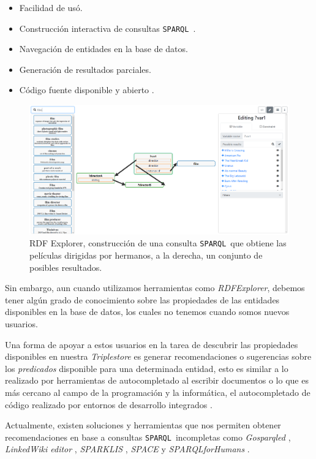 \documentclass[conference,compsoc]{IEEEtran}
\newcommand{\spql}{\texttt{SPARQL}\ }
\begin{document}
\begin{itemize}
    \item Facilidad de usó.
    \item Construcción interactiva de consultas \spql.
    \item Navegación de entidades en la base de datos.
    \item Generación de resultados parciales.
    \item Código fuente disponible y abierto \cite{vargas2019rdfrepo}.
\end{itemize}

\begin{figure}
    \label{fig:rdfexplorer}
    \centering
    \includegraphics[width=\linewidth]{rdfexplorer.png}
    \caption{RDF Explorer, construcción de una consulta \spql que obtiene las películas dirigidas
    por hermanos, a la derecha, un conjunto de posibles resultados.}
\end{figure}

Sin embargo, aun cuando utilizamos herramientas como \textit{RDFExplorer}, debemos tener
algún grado de conocimiento sobre las propiedades de las entidades disponibles
en la base de datos, los cuales no tenemos cuando somos nuevos usuarios.

Una forma de apoyar a estos usuarios en la tarea de descubrir las propiedades disponibles
en nuestra \textit{Triplestore} es generar recomendaciones o sugerencias sobre los \textit{predicados}
disponible para una determinada entidad, esto es similar a lo realizado por herramientas de autocompletado
al escribir documentos o lo que es más cercano al campo de la programación y la informática, el
autocompletado de código realizado por entornos de desarrollo integrados \cite{bruch2009learning}.

Actualmente, existen soluciones y herramientas que nos permiten obtener recomendaciones en base a 
consultas \spql incompletas como \textit{Gosparqled} \cite{campinas2014live}, \textit{LinkedWiki editor}
\cite{rafes2018designing}, \textit{SPARKLIS} \cite{ferre2017sparklis}, \textit{SPACE} \cite{kramer2013space}
y \textit{SPARQLforHumans} \cite{parra2020autocompletion}.
\end{document}
